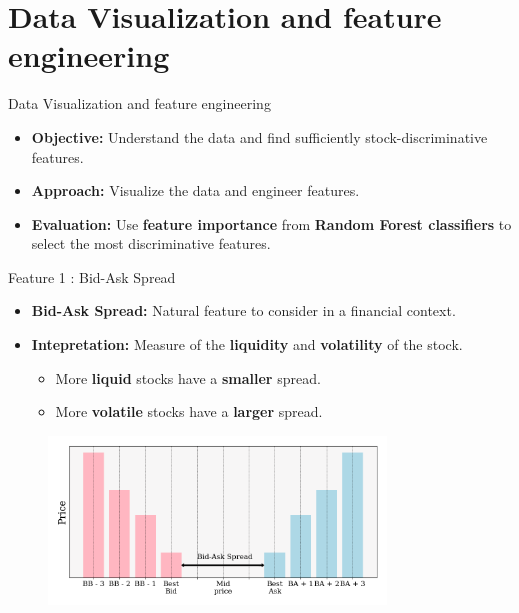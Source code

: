 \documentclass{beamer}
\begin{document}
\section{Data Visualization and feature engineering}
\begin{frame}{Data Visualization and feature engineering}
    \begin{itemize}
        \item \textbf{Objective:} Understand the data and find sufficiently stock-discriminative features.
        \item \textbf{Approach:} Visualize the data and engineer features.
        \item \textbf{Evaluation:} Use \textbf{feature importance} from \textbf{Random Forest classifiers} to select the most discriminative features.
    \end{itemize}
\end{frame}
\begin{frame}{Feature 1 : Bid-Ask Spread}
    \begin{itemize}
        \item \textbf{Bid-Ask Spread:} Natural feature to consider in a financial context.
        \item \textbf{Intepretation:} Measure of the \textbf{liquidity} and \textbf{volatility} of the stock.
              \begin{itemize}
                  \item More \textbf{liquid} stocks have a \textbf{smaller} spread.
                  \item More \textbf{volatile} stocks have a \textbf{larger} spread.
              \end{itemize}
    \end{itemize}
    \begin{figure}[H]
        \centering
        \includegraphics[width=0.8\textwidth]{figures/spread_def.png}
    \end{figure}
\end{frame}
\end{document}

